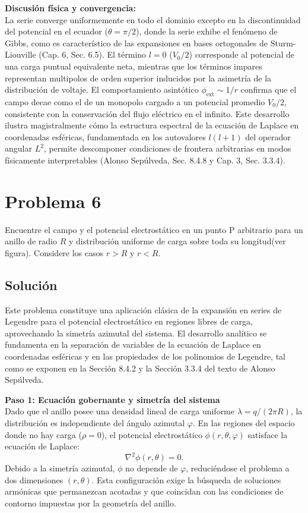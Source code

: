 \documentclass[a4paper]{article}
\begin{document}
\vspace{0.3cm}
\noindent\textbf{Discusión física y convergencia:}\\
La serie converge uniformemente en todo el dominio excepto en la discontinuidad del potencial en el ecuador ($\theta = \pi/2$), donde la serie exhibe el fenómeno de Gibbs, como es característico de las expansiones en bases ortogonales de Sturm-Liouville (Cap. 6, Sec. 6.5). El término $l=0$ ($V_0/2$) corresponde al potencial de una carga puntual equivalente neta, mientras que los términos impares representan multipolos de orden superior inducidos por la asimetría de la distribución de voltaje. El comportamiento asintótico $\phi_{\text{ext}} \sim 1/r$ confirma que el campo decae como el de un monopolo cargado a un potencial promedio $V_0/2$, consistente con la conservación del flujo eléctrico en el infinito. Este desarrollo ilustra magistralmente cómo la estructura espectral de la ecuación de Laplace en coordenadas esféricas, fundamentada en los autovalores $l(l+1)$ del operador angular $L^2$, permite descomponer condiciones de frontera arbitrarias en modos físicamente interpretables (Alonso Sepúlveda, Sec. 8.4.8 y Cap. 3, Sec. 3.3.4).


\section{Problema 6}
Encuentre el campo y el potencial electrostático en un punto P arbitrario para un anillo de radio $R$ y distribución uniforme de carga sobre toda su longitud(ver figura). Considere los casos $r> R$ y $r< R$.

\subsection{Solución}
Este problema constituye una aplicación clásica de la expansión en series de Legendre para el potencial electrostático en regiones libres de carga, aprovechando la simetría azimutal del sistema. El desarrollo analítico se fundamenta en la separación de variables de la ecuación de Laplace en coordenadas esféricas y en las propiedades de los polinomios de Legendre, tal como se exponen en la Sección 8.4.2 y la Sección 3.3.4 del texto de Alonso Sepúlveda.

\vspace{0.3cm}
\noindent\textbf{Paso 1: Ecuación gobernante y simetría del sistema}\\
Dado que el anillo posee una densidad lineal de carga uniforme $\lambda = q/(2\pi R)$, la distribución es independiente del ángulo azimutal $\varphi$. En las regiones del espacio donde no hay carga ($\rho = 0$), el potencial electrostático $\phi(r, \theta, \varphi)$ satisface la ecuación de Laplace:
$$
\nabla^2 \phi(r, \theta) = 0.
$$
Debido a la simetría azimutal, $\phi$ no depende de $\varphi$, reduciéndose el problema a dos dimensiones $(r, \theta)$. Esta configuración exige la búsqueda de soluciones armónicas que permanezcan acotadas y que coincidan con las condiciones de contorno impuestas por la geometría del anillo.
\end{document}
